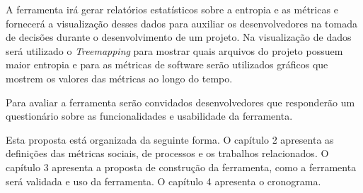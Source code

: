 A ferramenta irá gerar relatórios estatísticos sobre a entropia e as métricas e fornecerá a visualização desses dados para auxiliar os desenvolvedores na tomada de decisões durante o desenvolvimento de um projeto. Na visualização de dados será utilizado o \textit{Treemapping} para  mostrar quais arquivos do projeto possuem maior entropia e para as métricas de software serão utilizados gráficos que mostrem os valores das métricas ao longo do tempo.

Para avaliar a ferramenta serão convidados desenvolvedores que responderão um questionário sobre as funcionalidades e usabilidade da ferramenta.  

Esta proposta está organizada da seguinte forma. O capítulo 2 apresenta as definições das métricas sociais, de processos e os trabalhos relacionados. O capítulo 3 apresenta a proposta de construção da ferramenta, como a ferramenta será validada e uso da ferramenta. O capítulo 4 apresenta o cronograma.